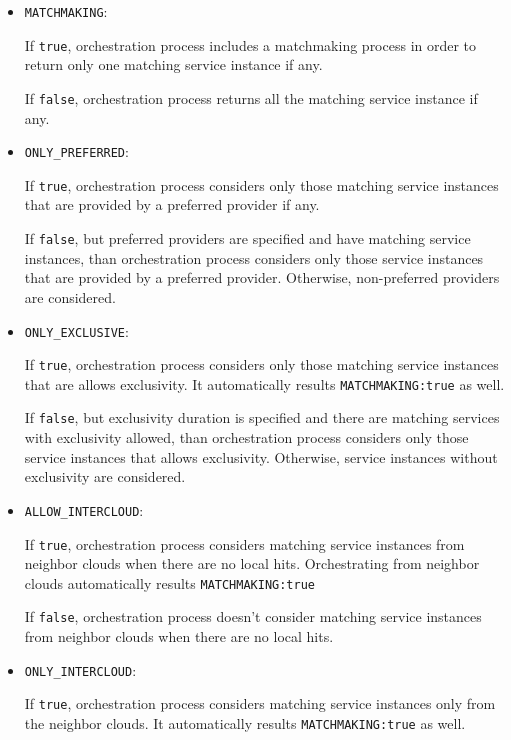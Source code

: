 \documentclass[a4paper]{arrowhead}
\begin{document}
\begin{itemize}
    \item \texttt{MATCHMAKING}:
    
    If \texttt{true}, orchestration process includes a matchmaking process in order to return only one matching service instance if any. 

    If \texttt{false}, orchestration process returns all the matching service instance if any. 
    
    \item \texttt{ONLY\_PREFERRED}:

    If \texttt{true}, orchestration process considers only those matching service instances that are provided by a preferred provider if any.

    If \texttt{false}, but preferred providers are specified and have matching service instances, than orchestration process considers only those service instances that are provided by a preferred provider. Otherwise, non-preferred providers are considered.
    
    \item \texttt{ONLY\_EXCLUSIVE}:

    If \texttt{true}, orchestration process considers only those matching service instances that are allows exclusivity. It automatically results \texttt{MATCHMAKING:true} as well.

    If \texttt{false}, but exclusivity duration is specified and there are matching services with exclusivity allowed, than orchestration process considers only those service instances that allows exclusivity. Otherwise, service instances without exclusivity are considered.
    
    \item \texttt{ALLOW\_INTERCLOUD}:

    If \texttt{true}, orchestration process considers matching service instances from neighbor clouds when there are no local hits. Orchestrating from neighbor clouds automatically results \texttt{MATCHMAKING:true}

    If \texttt{false}, orchestration process doesn't consider matching service instances from neighbor clouds when there are no local hits.

    \item \texttt{ONLY\_INTERCLOUD}:

    If \texttt{true}, orchestration process considers matching service instances only from the neighbor clouds. It automatically results \texttt{MATCHMAKING:true} as well.


\end{itemize}
\end{document}
